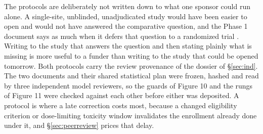 The protocols are deliberately not written down to what one sponsor could run
alone. A single-site, unblinded, unadjudicated study would have been easier to
open and would not have answered the comparative question, and the Phase 1
document says as much when it defers that question to a randomized trial
\cite{onpremwhippl, phase2proto}. Writing to the study that answers the question
and then stating plainly what is missing is more useful to a funder than writing
to the study that could be opened tomorrow.
Both protocols carry the review provenance of the dossier of \S\ref{sec:ind}.
The two documents and their shared statistical plan were frozen, hashed and read
by three independent model reviewers, so the guards of Figure 10 and the rungs
of Figure 11 were checked against each other before either was deposited. A
protocol is where a late correction costs most, because a changed eligibility
criterion or dose-limiting toxicity window invalidates the enrollment already
done under it, and \S\ref{sec:peerreview} prices that delay.
